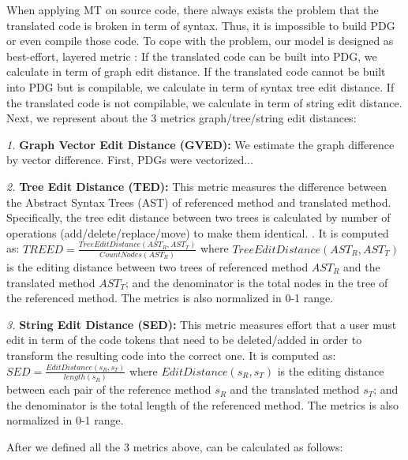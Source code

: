 
When applying MT on source code, there always exists the problem that the translated code is broken in term of syntax. Thus, it is impossible to build PDG or even compile those code. To cope with the problem, our model is designed as best-effort, layered metric  : If the translated code can be built into PDG, we calculate {\model} in term of graph edit distance. If the translated code cannot be built into PDG but is compilable, we calculate {\model} in term of syntax tree edit distance. If the translated code is not compilable, we calculate {\model} in term of string edit distance. Next, we represent about the 3 metrics graph/tree/string edit distances: 

\emph{1.} \textbf{Graph Vector Edit Distance (GVED):} We estimate the graph difference by vector difference. First, PDGs were vectorized...

\emph{2.} \textbf{Tree Edit Distance (TED):} This metric measures the difference between the Abstract Syntax Trees (AST) of referenced method and translated method. Specifically, the tree edit distance between two trees is calculated by number of operations (add/delete/replace/move) to make them identical. \cite{algorithm}. 
It is computed as:  $TREED = \frac{TreeEditDistance\left(AST_R, AST_T\right)}{CountNodes \left(AST_R\right)}$ where $TreeEditDistance\left(AST_R, AST_T\right)$ is the editing distance between two trees of referenced method $AST_R$ and the translated method $AST_T$; and the denominator is the total nodes in the tree of the referenced method.  The metrics is also normalized in 0-1 range.

\emph{3.} \textbf{String Edit Distance (SED):} This metric measures
effort that a user must edit in term of the code tokens
that need to be deleted/added in order to transform the
resulting code into the correct one. It is computed as:  $SED = \frac{EditDistance\left(s_R, s_T\right)}{length\left(s_R\right)}$ where $EditDistance\left(s_R, s_T\right)$ is the editing distance between each pair of the reference method $s_R$ and the translated method $s_T$; and the denominator is the total length of the referenced method. The metrics is also normalized in 0-1 range. 

After we defined all the 3 metrics above, {\model} can be calculated as follows: 

